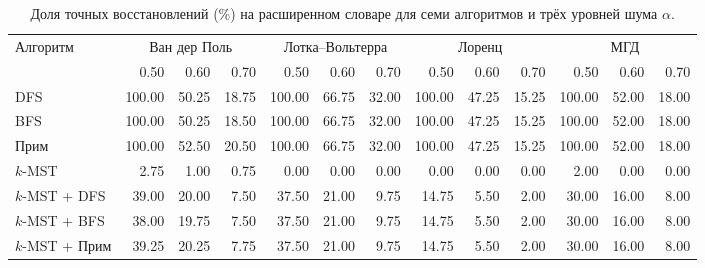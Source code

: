 \documentclass[12pt]{article}
\begin{document}
\begin{table}[!htbp]
  \centering
  \small
  \setlength{\tabcolsep}{2pt}
  \caption{\protect\foreignlanguage{russian}{Доля точных восстановлений (\%) на расширенном словаре для семи алгоритмов и трёх уровней шума $\alpha$.}}
  \label{tab:physical-algorithms}
  \begin{otherlanguage}{russian}
  \begin{tabular}{lrrrrrrrrrrrr}
  \toprule
  Алгоритм & \multicolumn{3}{c}{Ван дер Поль} & \multicolumn{3}{c}{Лотка--Вольтерра} & \multicolumn{3}{c}{Лоренц} & \multicolumn{3}{c}{МГД}\\
  \cmidrule(lr){2-4}\cmidrule(lr){5-7}\cmidrule(lr){8-10}\cmidrule(lr){11-13}
   & 0.50 & 0.60 & 0.70 & 0.50 & 0.60 & 0.70 & 0.50 & 0.60 & 0.70 & 0.50 & 0.60 & 0.70\\
  \midrule
  DFS & 100.00 & 50.25 & 18.75 & 100.00 & 66.75 & 32.00 & 100.00 & 47.25 & 15.25 & 100.00 & 52.00 & 18.00\\
  BFS & 100.00 & 50.25 & 18.50 & 100.00 & 66.75 & 32.00 & 100.00 & 47.25 & 15.25 & 100.00 & 52.00 & 18.00\\
  Прим & 100.00 & 52.50 & 20.50 & 100.00 & 66.75 & 32.00 & 100.00 & 47.25 & 15.25 & 100.00 & 52.00 & 18.00\\
  $k$-MST & 2.75 & 1.00 & 0.75 & 0.00 & 0.00 & 0.00 & 0.00 & 0.00 & 0.00 & 2.00 & 0.00 & 0.00\\
  $k$-MST + DFS & 39.00 & 20.00 & 7.50 & 37.50 & 21.00 & 9.75 & 14.75 & 5.50 & 2.00 & 30.00 & 16.00 & 8.00\\
  $k$-MST + BFS & 38.00 & 19.75 & 7.50 & 37.50 & 21.00 & 9.75 & 14.75 & 5.50 & 2.00 & 30.00 & 16.00 & 8.00\\
  $k$-MST + Прим & 39.25 & 20.25 & 7.75 & 37.50 & 21.00 & 9.75 & 14.75 & 5.50 & 2.00 & 30.00 & 16.00 & 8.00\\
  \bottomrule
  \end{tabular}
  \end{otherlanguage}
\end{table}
\end{document}
